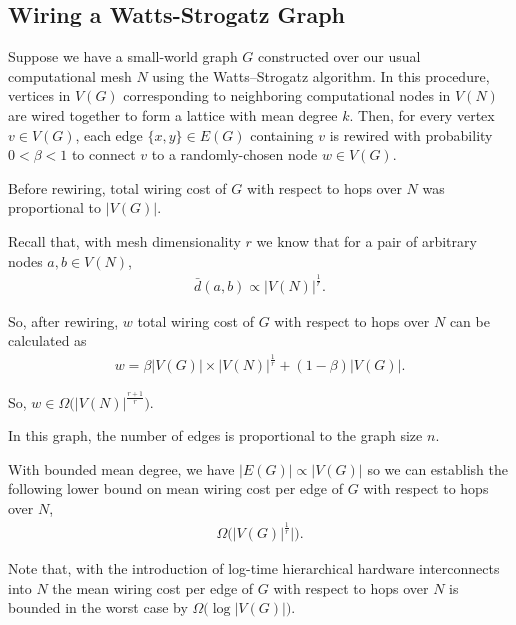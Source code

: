 \subsection{Wiring a Watts-Strogatz Graph} \label{sec:proof4}

Suppose we have a small-world graph $G$ constructed over our usual computational mesh $N$ using the Watts–Strogatz algorithm.
In this procedure, vertices in $V(G)$ corresponding to neighboring computational nodes in $V(N)$ are wired together to form a lattice with mean degree $k$.
Then, for every vertex $v \in V(G)$, each edge $\{x, y\} \in E(G)$ containing $v$ is rewired with probability $0 < \beta < 1$ to connect $v$ to a randomly-chosen node $w \in V(G)$.

Before rewiring, total wiring cost of $G$ with respect to hops over $N$ was proportional to $|V(G)|$.

Recall that, with mesh dimensionality $r$ we know that for a pair of arbitrary nodes $a,b \in V(N)$,
\begin{align*}
\bar{d}(a, b) \propto |V(N)|^{\frac{1}{r}}.
\end{align*}

So, after rewiring, $w$ total wiring cost of $G$ with respect to hops over $N$ can be calculated as
\begin{align*}
w = \beta |V(G)| \times |V(N)|^{\frac{1}{r}} + (1 - \beta) |V(G)|.
\end{align*}

So, $w \in \Omega \Big( |V(N)|^{\frac{r+1}{r}} \Big).$

In this graph, the number of edges is proportional to the graph size $n$.

With bounded mean degree, we have $|E(G)| \propto |V(G)|$ so we can establish the following lower bound on mean wiring cost per edge of $G$ with respect to hops over $N$,
\begin{align*}
\Omega \Big( |V(G)|^{\frac{1}{r}}| \Big).
\end{align*}

Note that, with the introduction of log-time hierarchical hardware interconnects into $N$ the mean wiring cost per edge of $G$ with respect to hops over $N$ is bounded in the worst case by $\Omega \Big( \log |V(G)| \Big)$.
